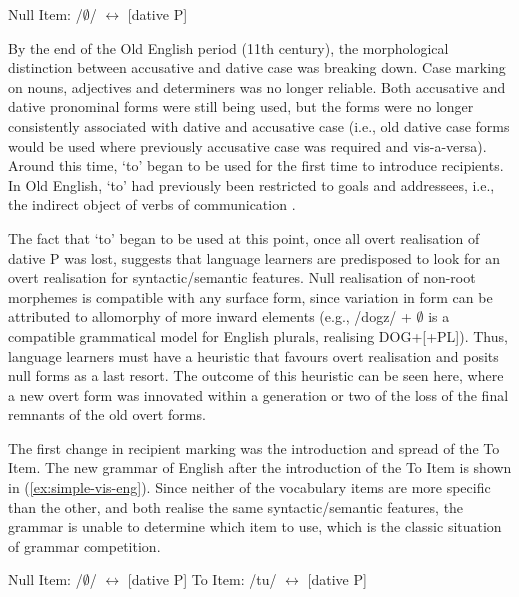 	\begin{exe}
		\ex \label{ex:old-eng-vi}
		\begin{xlist}
			\ex Null Item:  /$\emptyset$/ $\leftrightarrow$ [dative P]
		\end{xlist}
	\end{exe}
	
	By the end of the Old English period (11th century), the morphological distinction between accusative and dative case was breaking down. Case marking on nouns, adjectives and determiners was no longer reliable. Both accusative and dative pronominal forms were still being used, but the forms were no longer consistently associated with dative and accusative case (i.e., old dative case forms would be used where previously accusative case was required and vis-a-versa). Around this time, `to' began to be used for the first time to introduce recipients. In Old English, `to' had previously been restricted to goals and addressees, i.e., the indirect object of verbs of communication \citep{Allen.1999,McFadden.2002,OED.2013}. 
	
	The fact that `to' began to be used at this point, once all overt realisation of dative P was lost, suggests that language learners are predisposed to look for an overt realisation for syntactic/semantic features. Null realisation of non-root morphemes is compatible with any surface form, since variation in form can be attributed to allomorphy of more inward elements (e.g., /dogz/ + $\emptyset$ is a compatible grammatical model for English plurals, realising DOG+[+PL]). Thus, language learners must have a heuristic that favours overt realisation and posits null forms as a last resort. The outcome of this heuristic can be seen here, where a new overt form was innovated within a generation or two of the loss of the final remnants of the old overt forms. 

	The first change in recipient marking was the introduction and spread of the To Item. The new grammar of English after the introduction of the To Item is shown in (\ref{ex:simple-vis-eng}). Since neither of the vocabulary items are more specific than the other, and both realise the same syntactic/semantic features, the grammar is unable to determine which item to use, which is the classic situation of grammar competition.

	\begin{exe}
		\ex \label{ex:simple-vis-eng}
		\begin{xlist}
			\ex Null Item: /$\emptyset$/ $\leftrightarrow$ [dative P]
			\ex To Item: /tu/ $\leftrightarrow$ [dative P]
		\end{xlist}
	\end{exe}


